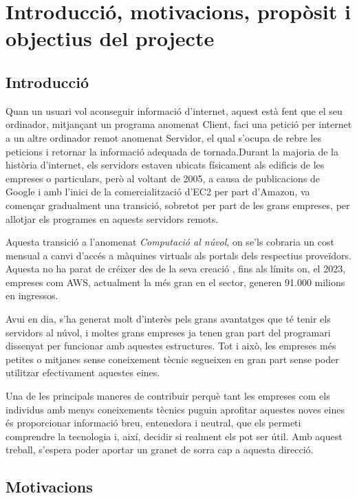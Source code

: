 \chapter{Introducció, motivacions, propòsit i objectius del projecte}

\section{Introducció}

Quan un usuari vol aconseguir informació d'internet, aquest està fent que el seu ordinador, mitjançant un programa anomenat Client, faci una petició per internet a un altre ordinador remot anomenat Servidor, el qual s'ocupa de rebre les peticions i retornar la informació adequada de tornada.\cite{wen_clientserver_1998}Durant la majoria de la història d'internet, els servidors estaven ubicats físicament als edificis de les empreses o particulars, però al voltant de 2005, a causa de publicacions de Google i amb l'inici de la comercialització d'EC2 per part d'Amazon, va començar gradualment una transició, sobretot per part de les grans empreses, per allotjar els programes en aquests servidors remots.

Aquesta transició a l'anomenat \textit{Computació al núvol}, on se'ls cobraria un cost mensual a canvi d'accés a màquines virtuals als portals dels respectius proveïdors.\cite{qian_cloud_2009}
Aquesta no ha parat de créixer des de la seva creació , fins als límits on, el 2023, empreses com AWS, actualment la més gran en el sector, generen 91.000 milions en ingressos.\cite{p_bezos_amazon-com-inc-2023-shareholder-letter_2024}

Avui en dia, s'ha generat molt d'interès pels grans avantatges que té tenir els servidors al núvol, i moltes grans empreses ja tenen gran part del programari dissenyat per funcionar amb aquestes estructures. Tot i això, les empreses més petites o mitjanes sense coneixement tècnic segueixen en gran part sense poder utilitzar efectivament aquestes eines. \cite{khan_systematic_2024}

Una de les principals maneres de contribuir perquè tant les empreses com els individus amb menys coneixements tècnics puguin aprofitar aquestes noves eines és proporcionar informació breu, entenedora i neutral, que els permeti comprendre la tecnologia i, així, decidir si realment els pot ser útil. Amb aquest treball, s'espera poder aportar un granet de sorra cap a aquesta direcció.

\newpage
\section{Motivacions}

